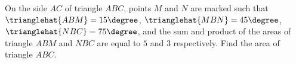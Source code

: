On the side ${AC}$ of triangle ${ABC}$, points $M$ and $N$ are marked such that $\trianglehat{ABM}=15\degree$, $\trianglehat{MBN}=45\degree$, $\trianglehat{NBC}=75\degree$, and the sum and product of the areas of triangle ${ABM}$ and ${NBC}$ are equal to $5$ and $3$ respectively. Find the area of triangle ${ABC}$.
